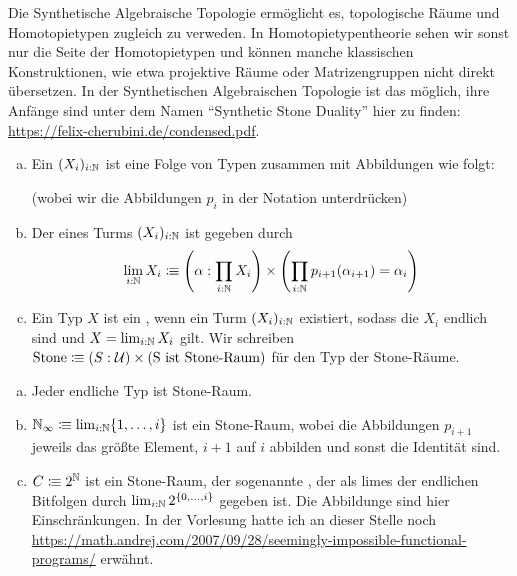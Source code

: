 Die Synthetische Algebraische Topologie ermöglicht es, topologische Räume und Homotopietypen zugleich zu verweden. In Homotopietypentheorie sehen wir sonst nur die Seite der Homotopietypen und können manche klassischen Konstruktionen, wie etwa projektive Räume oder Matrizengruppen nicht direkt übersetzen. In der Synthetischen Algebraischen Topologie ist das möglich, ihre Anfänge sind unter dem Namen ``Synthetic Stone Duality'' hier zu finden: \href{https://felix-cherubini.de/condensed.pdf}{https://felix-cherubini.de/condensed.pdf}.

\begin{definition}
  \begin{enumerate}[(a)]
  \item Ein  \((X_i)_{i:\mathbb{N}}\) ist eine Folge von Typen zusammen mit Abbildungen wie folgt:
    \begin{center}
    \end{center}
    (wobei wir die Abbildungen \(p_i\) in der Notation unterdrücken)
  \item Der  eines Turms \((X_i)_{i:\mathbb{N}}\) ist gegeben durch
    \[
      \lim_{i:\mathbb{N}}X_i\vcentcolon\mspace{-1.2mu}\equiv \left(\alpha : \prod_{i:\mathbb{N}}X_i\right)\times\left(\prod_{i:\mathbb{N}}p_{i+1}(\alpha_{i+1})=\alpha_i\right)
      \]
    \item Ein Typ \(X\) ist ein , wenn ein Turm \((X_i)_{i:\mathbb{N}}\) existiert, sodass die \(X_i\) endlich sind und \(X=\lim_{i:\mathbb{N}}X_i\) gilt.
      Wir schreiben \(\mathrm{Stone}\vcentcolon\mspace{-1.2mu}\equiv (S:\mathcal{U})\times(\text{S ist Stone-Raum})\) für den Typ der Stone-Räume.
  \end{enumerate}
\end{definition}

\begin{beispiel}
  \begin{enumerate}[(a)]
  \item Jeder endliche Typ ist Stone-Raum.
  \item \(\mathbb{N}_\infty\vcentcolon\mspace{-1.2mu}\equiv \lim_{i:\mathbb{N}}\{1,\dots,i\}\) ist ein Stone-Raum, wobei die Abbildungen \(p_{i+1}\) jeweils das größte Element, \(i+1\) auf \(i\) abbilden und sonst die Identität sind.
  \item \(C\vcentcolon\mspace{-1.2mu}\equiv 2^{\mathbb{N}}\) ist ein Stone-Raum, der sogenannte , der als limes der endlichen Bitfolgen durch \(\lim_{i:\mathbb{N}}2^{\{0,\dots,i\}}\) gegeben ist. Die Abbildunge sind hier Einschränkungen.
    In der Vorlesung hatte ich an dieser Stelle noch \href{https://math.andrej.com/2007/09/28/seemingly-impossible-functional-programs/}{https://math.andrej.com/2007/09/28/seemingly-impossible-functional-programs/} erwähnt.
  \end{enumerate}
\end{beispiel}

